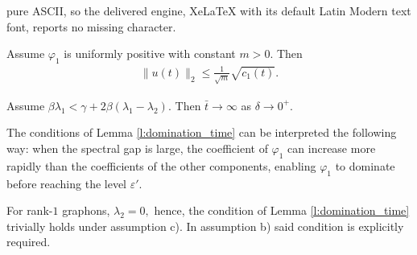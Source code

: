 \documentclass[10pt,a4paper]{amsart}
\begin{document}
pure ASCII, so the delivered engine, XeLaTeX with its default Latin Modern text font, reports no missing character.
\begin{lemma}
	\label{l:c1_bound}
	Assume $\varphi_1$ is uniformly positive with constant $m>0.$ Then 
	\begin{align*}	
		\|u(t) \|_2 \leq \frac{1}{\sqrt{m}}\sqrt{c_1(t)}.
	\end{align*}
\end{lemma}

\begin{lemma}
\label{l:domination_time}

Assume $\beta \lambda_1<\gamma+2\beta(\lambda_1-\lambda_2).$ Then
$ \bar{t} \to \infty $ as $\delta \to 0^{+}.$
\end{lemma}

\begin{remark}
The conditions of Lemma \ref{l:domination_time} can be interpreted the following way: when the spectral gap is large, the coefficient of $\varphi_1$ can increase more rapidly than the coefficients of the other components, enabling
 $\varphi_1$ to dominate before reaching the level $\varepsilon'$.

For rank-$1$ graphons, $\lambda_2=0,$ hence, the condition of Lemma \ref{l:domination_time} trivially holds under assumption c). In assumption b) said condition is explicitly required.
\end{remark}
\end{document}
